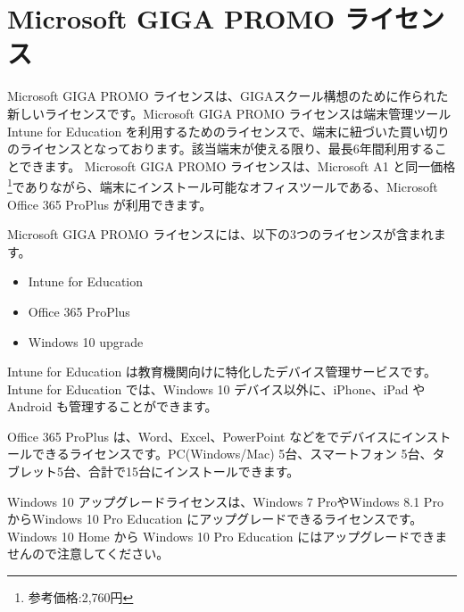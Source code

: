 \section{Microsoft GIGA PROMO ライセンス}

Microsoft GIGA PROMO ライセンスは、GIGAスクール構想のために作られた新しいライセンスです。Microsoft GIGA PROMO ライセンスは端末管理ツール Intune for Education を利用するためのライセンスで、端末に紐づいた買い切りのライセンスとなっております。該当端末が使える限り、最長6年間利用することできます。
Microsoft GIGA PROMO ライセンスは、Microsoft A1 と同一価格\footnote{参考価格:2,760円}でありながら、端末にインストール可能なオフィスツールである、Microsoft Office 365 ProPlus が利用できます。

Microsoft GIGA PROMO ライセンスには、以下の3つのライセンスが含まれます。

\begin{itemize}
    \item Intune for Education
    \item Office 365 ProPlus
    \item Windows 10 upgrade
\end{itemize}

Intune for Education は教育機関向けに特化したデバイス管理サービスです。Intune for Education では、Windows 10 デバイス以外に、iPhone、iPad や Android も管理することができます。

Office 365 ProPlus は、Word、Excel、PowerPoint などをでデバイスにインストールできるライセンスです。PC(Windows/Mac) 5台、スマートフォン 5台、タブレット5台、合計で15台にインストールできます。

Windows 10 アップグレードライセンスは、Windows 7 ProやWindows 8.1 Pro からWindows 10 Pro Education にアップグレードできるライセンスです。Windows 10 Home から Windows 10 Pro Education にはアップグレードできませんので注意してください。